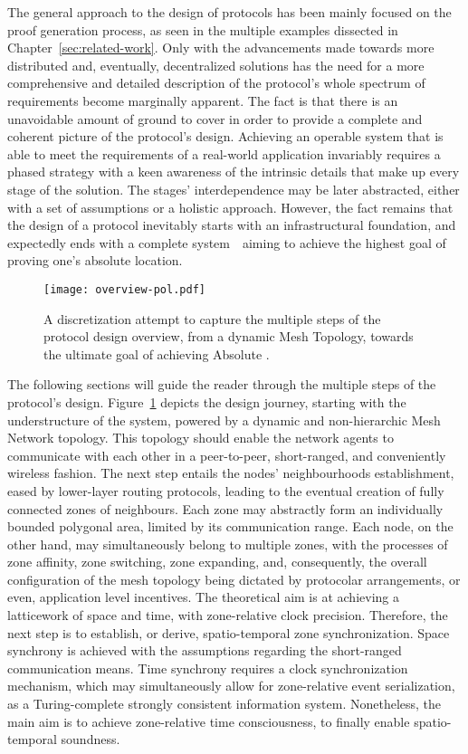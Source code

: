 The general approach to the design of \pol{} protocols has been mainly focused on the proof generation process, as seen in the multiple examples dissected in Chapter~\ref{sec:related-work}. Only with the advancements made towards more distributed and, eventually, decentralized solutions has the need for a more comprehensive and detailed description of the protocol's whole spectrum of requirements become marginally apparent. The fact is that there is an unavoidable amount of ground to cover in order to provide a complete and coherent picture of the protocol's design. Achieving an operable system that is able to meet the requirements of a real-world application invariably requires a phased strategy with a keen awareness of the intrinsic details that make up every stage of the solution. The stages' interdependence may be later abstracted, either with a set of assumptions or a holistic approach. However, the fact remains that the design of a \pol{} protocol inevitably starts with an infrastructural foundation, and expectedly ends with a complete system~\textemdash~aiming to achieve the highest goal of proving one's absolute location.

\begin{figure}[ht]
    \begin{center}
    \texttt{[image: overview-pol.pdf]}
    \caption{A discretization attempt to capture the multiple steps of the protocol design overview, from a dynamic Mesh Topology, towards the ultimate goal of achieving Absolute \pol.}
    \label{fig:proof-of-location-overview}
    \end{center}
\end{figure}

The following sections will guide the reader through the multiple steps of the protocol's design. Figure~\ref{fig:proof-of-location-overview} depicts the design journey, starting with the understructure of the system, powered by a dynamic and non-hierarchic Mesh Network topology. This topology should enable the network agents to communicate with each other in a peer-to-peer, short-ranged, and conveniently wireless fashion. The next step entails the nodes' neighbourhoods establishment, eased by lower-layer routing protocols, leading to the eventual creation of fully connected zones of neighbours. Each zone may abstractly form an individually bounded polygonal area, limited by its communication range. Each node, on the other hand, may simultaneously belong to multiple zones, with the processes of zone affinity, zone switching, zone expanding, and, consequently, the overall configuration of the mesh topology being dictated by protocolar arrangements, or even, application level incentives. The theoretical aim is at achieving a latticework of space and time, with zone-relative clock precision. Therefore, the next step is to establish, or derive, spatio-temporal zone synchronization. Space synchrony is achieved with the assumptions regarding the short-ranged communication means. Time synchrony requires a clock synchronization mechanism, which may simultaneously allow for zone-relative event serialization, as a Turing-complete strongly consistent information system. Nonetheless, the main aim is to achieve zone-relative time consciousness, to finally enable spatio-temporal soundness.

